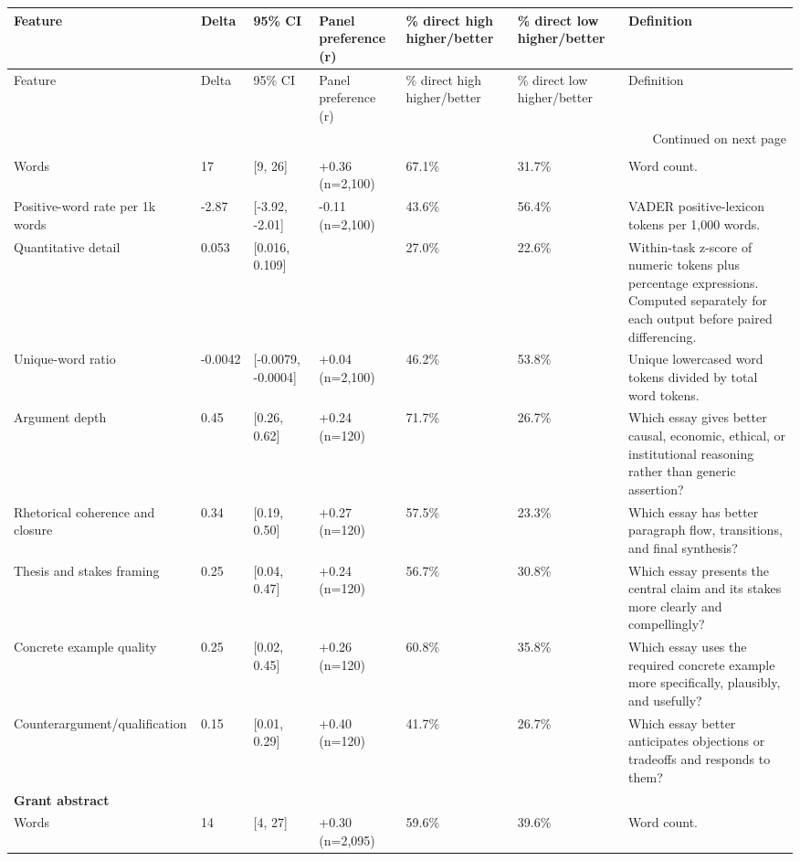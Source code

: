 \begin{longtable}{lllllll}
\toprule
Feature & Delta & 95\% CI & Panel preference (r) & \% direct high higher/better & \% direct low higher/better & Definition \\
\midrule
\endfirsthead
\toprule
Feature & Delta & 95\% CI & Panel preference (r) & \% direct high higher/better & \% direct low higher/better & Definition \\
\midrule
\endhead
\midrule
\multicolumn{7}{r}{Continued on next page} \\
\midrule
\endfoot
\bottomrule
\endlastfoot
\multicolumn{7}{l}{\textbf{Essay writing}} \\
Words & 17 & [9, 26] & +0.36 (n=2,100) & 67.1\% & 31.7\% & Word count. \\
Positive-word rate per 1k words & -2.87 & [-3.92, -2.01] & -0.11 (n=2,100) & 43.6\% & 56.4\% & VADER positive-lexicon tokens per 1,000 words. \\
Quantitative detail & 0.053 & [0.016, 0.109] &  & 27.0\% & 22.6\% & Within-task z-score of numeric tokens plus percentage expressions. Computed separately for each output before paired differencing. \\
Unique-word ratio & -0.0042 & [-0.0079, -0.0004] & +0.04 (n=2,100) & 46.2\% & 53.8\% & Unique lowercased word tokens divided by total word tokens. \\
Argument depth & 0.45 & [0.26, 0.62] & +0.24 (n=120) & 71.7\% & 26.7\% & Which essay gives better causal, economic, ethical, or institutional reasoning rather than generic assertion? \\
Rhetorical coherence and closure & 0.34 & [0.19, 0.50] & +0.27 (n=120) & 57.5\% & 23.3\% & Which essay has better paragraph flow, transitions, and final synthesis? \\
Thesis and stakes framing & 0.25 & [0.04, 0.47] & +0.24 (n=120) & 56.7\% & 30.8\% & Which essay presents the central claim and its stakes more clearly and compellingly? \\
Concrete example quality & 0.25 & [0.02, 0.45] & +0.26 (n=120) & 60.8\% & 35.8\% & Which essay uses the required concrete example more specifically, plausibly, and usefully? \\
Counterargument/qualification & 0.15 & [0.01, 0.29] & +0.40 (n=120) & 41.7\% & 26.7\% & Which essay better anticipates objections or tradeoffs and responds to them? \\
\multicolumn{7}{l}{\textbf{Grant abstract}} \\
Words & 14 & [4, 27] & +0.30 (n=2,095) & 59.6\% & 39.6\% & Word count. \\

\end{longtable}
